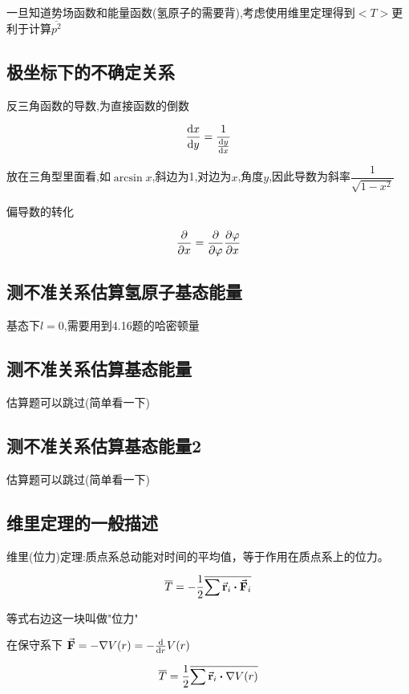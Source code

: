             一旦知道势场函数和能量函数(氢原子的需要背),考虑使用维里定理得到$<T>$更利于计算$\overline{p^{2}}$

        \subsection{极坐标下的不确定关系}
            \begin{formal}
                反三角函数的导数,为直接函数的倒数

                $$ \dv{x}{y} = \dfrac{1}{\dv{y}{x}} $$

                放在三角型里面看,如$\arcsin{x}$,斜边为1,对边为$x$,角度$y$,因此导数为斜率$\dfrac{1}{\sqrt{1-x^{2}}}$
            \end{formal}

            偏导数的转化

            $$ \pdv{x} = \pdv{\varphi} \pdv{\varphi}{x} $$

        \subsection{测不准关系估算氢原子基态能量}
            基态下$l=0$,需要用到4.16题的哈密顿量

        \subsection{测不准关系估算基态能量}
            估算题可以跳过(简单看一下)
            
        \subsection{测不准关系估算基态能量2}
            估算题可以跳过(简单看一下)

        \subsection{维里定理的一般描述}
            \begin{formal}
                维里(位力)定理:质点系总动能对时间的平均值，等于作用在质点系上的位力。

                $$ \overline{T} = -\frac{1}{2} \overline{\sum{\va{r}_{i} \vdot \va{F}_{i} }} $$

                等式右边这一块叫做"位力"

                在保守系下  $ \va{F} = - \nabla V(r) = - \dv{r} V(r) $
                
                $$ \overline{T} = \frac{1}{2} \overline{\sum{\va{r}_{i} \vdot \nabla V(r) }} $$
                
            \end{formal}
            
